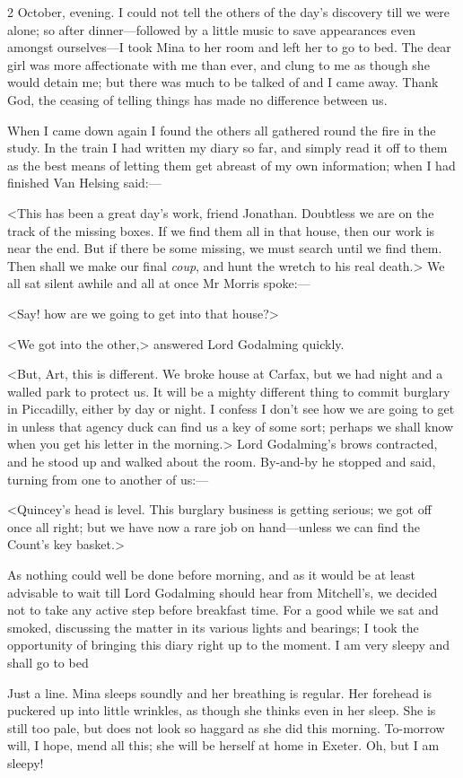 \begin{diary}{2 October, evening.}
I could not tell the others of the day's discovery till we were alone; so after dinner—followed by a little music to save appearances even amongst ourselves—I took Mina to her room and left her to go to bed. The dear girl was more affectionate with me than ever, and clung to me as though she would detain me; but there was much to be talked of and I came away. Thank God, the ceasing of telling things has made no difference between us.

When I came down again I found the others all gathered round the fire in the study. In the train I had written my diary so far, and simply read it off to them as the best means of letting them get abreast of my own information; when I had finished Van Helsing said:—

<This has been a great day's work, friend Jonathan. Doubtless we are on the track of the missing boxes. If we find them all in that house, then our work is near the end. But if there be some missing, we must search until we find them. Then shall we make our final \textit{coup}, and hunt the wretch to his real death.> We all sat silent awhile and all at once Mr Morris spoke:—

<Say! how are we going to get into that house?>

<We got into the other,> answered Lord Godalming quickly.

<But, Art, this is different. We broke house at Carfax, but we had night and a walled park to protect us. It will be a mighty different thing to commit burglary in Piccadilly, either by day or night. I confess I don't see how we are going to get in unless that agency duck can find us a key of some sort; perhaps we shall know when you get his letter in the morning.> Lord Godalming's brows contracted, and he stood up and walked about the room. By-and-by he stopped and said, turning from one to another of us:—

<Quincey's head is level. This burglary business is getting serious; we got off once all right; but we have now a rare job on hand—unless we can find the Count's key basket.>

As nothing could well be done before morning, and as it would be at least advisable to wait till Lord Godalming should hear from Mitchell's, we decided not to take any active step before breakfast time. For a good while we sat and smoked, discussing the matter in its various lights and bearings; I took the opportunity of bringing this diary right up to the moment. I am very sleepy and shall go to bed

Just a line. Mina sleeps soundly and her breathing is regular. Her forehead is puckered up into little wrinkles, as though she thinks even in her sleep. She is still too pale, but does not look so haggard as she did this morning. To-morrow will, I hope, mend all this; she will be herself at home in Exeter. Oh, but I am sleepy!
\end{diary}

